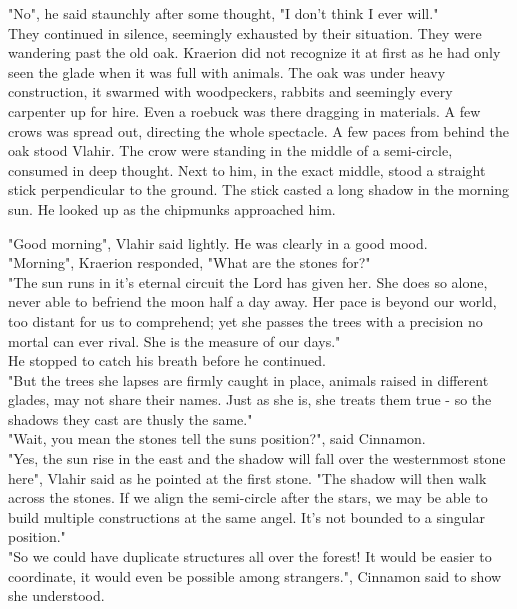 \documentclass[smalldemyvopaper,11pt,twoside,onecolumn,openright,extrafontsizes]{memoir}
\begin{document}
"No", he said staunchly after some thought, "I don't think I ever will."\\

They continued in silence, seemingly exhausted by their situation. They were wandering past the old oak. Kraerion did not recognize it at first as he had only seen the glade when it was full with animals. The oak was under heavy construction, it swarmed with woodpeckers, rabbits and seemingly every carpenter up for hire. Even a roebuck was there dragging in materials. A few crows was spread out, directing the whole spectacle. A few paces from behind the oak stood Vlahir. The crow were standing in the middle of a semi-circle, consumed in deep thought. Next to him, in the exact middle, stood a straight stick perpendicular to the ground. The stick casted a long shadow in the morning sun. He looked up as the chipmunks approached him. 

"Good morning", Vlahir said lightly. He was clearly in a good mood. \\

"Morning", Kraerion responded, "What are the stones for?"\\

"The sun runs in it's eternal circuit the Lord has given her. She does so alone, never able to befriend the moon half a day away. Her pace is beyond our world, too distant for us to comprehend; yet she passes the trees with a precision no mortal can ever rival. She is the measure of our days."\\

He stopped to catch his breath before he continued.\\

"But the trees she lapses are firmly caught in place, animals raised in different glades, may not share their names. Just as she is, she treats them true - so the shadows they cast are thusly the same."\\

"Wait, you mean the stones tell the suns position?", said Cinnamon.\\

"Yes, the sun rise in the east and the shadow will fall over the westernmost stone here", Vlahir said as he pointed at the first stone. "The shadow will then walk across the stones. If we align the semi-circle after the stars, we may be able to build multiple constructions at the same angel. It's not bounded to a singular position."\\

"So we could have duplicate structures all over the forest! It would be easier to coordinate, it would even be possible among strangers.", Cinnamon said to show she understood. 
\end{document}
